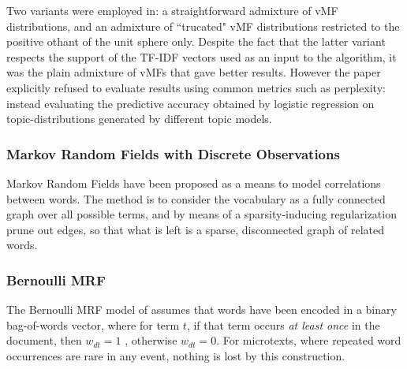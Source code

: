 Two variants were employed in\cite{Reisinger2010}: a straightforward admixture of vMF distributions, and an admixture of ``trucated" vMF distributions restricted to the positive othant of the unit sphere only. Despite the fact that the latter variant respects the support of the TF-IDF vectors used as an input to the algorithm, it was the plain admixture of vMFs that gave better results. However the paper explicitly refused to evaluate results using common metrics such as perplexity: instead evaluating the predictive accuracy obtained by logistic regression on topic-distributions generated by different topic models.

\subsubsection{Markov Random Fields with Discrete Observations}
Markov Random Fields have been proposed as a means to  model correlations between words. The method is to consider the vocabulary as a fully connected graph over all possible terms, and by means of a sparsity-inducing regularization prune out edges, so that what is left is a sparse, disconnected graph of related words.

%
%

\subsubsection*{Bernoulli MRF}
The Bernoulli MRF model of \cite{Nallapati2007} assumes that words have been encoded in a binary bag-of-words vector, where for term $t$, if that term occurs \emph{at least once} in the document, then $w_{dt} = 1$ , otherwise $w_{dt} = 0$. For microtexts, where repeated word occurrences are rare in any event, nothing is lost by this construction.

